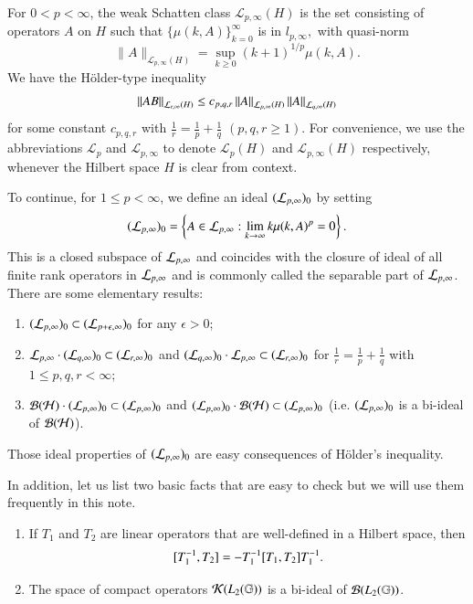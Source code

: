 \documentclass[leqno]{amsart}
\begin{document}
	For $0<p<\infty$, the weak Schatten class $\mathcal{L}_{p,\infty}(H)$ is the set consisting of operators $A$ on $H$ such that $\{\mu(k,A)\}_{k=0}^{\infty}$ is in $l_{p,\infty},$ with quasi-norm
	$$\|A\|_{\mathcal{L}_{p,\infty}(H)}=\sup_{k\geq0}(k+1)^{1/p}\mu(k,A).$$
	We have the H\"{o}lder-type inequality
	\begin{align*}
		\left\| AB \right\|_{{\mathcal L}_{r,\infty}(H)}\leq c_{p,q,r}\left\| A \right\|_{{\mathcal L}_{p,\infty}(H)}\left\| A \right\|_{{\mathcal L}_{q,\infty}(H)}
	\end{align*}
	for some constant $c_{p,q,r}$ with $\frac{1}{r}=\frac{1}{p}+\frac{1}{q}$ $(p,q,r\geq1)$.
	For convenience, we use the abbreviations $\mathcal{L}_p$ and $\mathcal{L}_{p,\infty}$ to denote $\mathcal{L}_p(H)$ and $\mathcal{L}_{p,\infty}(H)$ respectively, whenever the Hilbert space $H$ is clear from context.
	
	
	
	To continue, for $1\leq p<\infty$, we define an ideal $({\mathcal L}_{p,\infty})_{0}$ by setting
	\begin{align*}
		({\mathcal L}_{p,\infty})_{0}=\left\{ A\in{\mathcal L}_{p,\infty}:\lim_{k\rightarrow\infty}k\mu(k,A)^{p}=0 \right\}.
	\end{align*}
	This is a closed subspace of ${\mathcal L}_{p,\infty}$ and coincides with the closure of ideal of all finite rank operators in ${\mathcal L}_{p,\infty}$ and is commonly called the separable part of ${\mathcal L}_{p,\infty}$. 
	There are some elementary results:
	\begin{enumerate}[\rm(i)]
		\item $({\mathcal L}_{p,\infty})_{0}\subset({\mathcal L}_{p+\epsilon,\infty})_{0}$ for any $\epsilon>0$;
		\item ${\mathcal L}_{p,\infty}\cdot({\mathcal L}_{q,\infty})_{0}\subset({\mathcal L}_{r,\infty})_{0}$ and $({\mathcal L}_{q,\infty})_{0}\cdot{\mathcal L}_{p,\infty}\subset({\mathcal L}_{r,\infty})_{0}$ for $\frac{1}{r}=\frac{1}{p}+\frac{1}{q}$ with $1\leq p,q,r<\infty$;
		\item ${\mathcal B}({\mathcal H})\cdot({\mathcal L}_{p,\infty})_{0}\subset({\mathcal L}_{p,\infty})_{0}$ and $({\mathcal L}_{p,\infty})_{0}\cdot{\mathcal B}({\mathcal H})\subset({\mathcal L}_{p,\infty})_{0}$ (i.e. $({\mathcal L}_{p,\infty})_{0}$ is a bi-ideal of ${\mathcal B}({\mathcal H})$).   
	\end{enumerate}
	Those ideal properties of $({\mathcal L}_{p,\infty})_{0}$ are easy consequences of H\"{o}lder's inequality. 
	
	In addition, let us list two basic facts that are easy to check but we will use them frequently in this note.
	\begin{enumerate}[\rm (i)]
		\item If $T_{1}$ and $T_{2}$ are linear operators that are well-defined in a Hilbert space, then
		\begin{align}\label{commutator-inverse}
			[T_{1}^{-1},T_{2}]=-T_{1}^{-1}[T_{1},T_{2}]T_{1}^{-1}.
		\end{align}
		
		\item The space of compact operators ${\mathcal K}(L_{2}(\mathbb{G}))$ is a bi-ideal of ${\mathcal B}(L_{2}(\mathbb{G}))$.%
		
	\end{enumerate}
	
\end{document}
